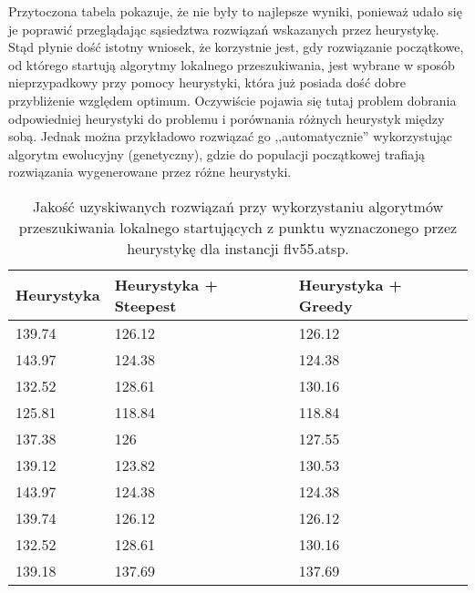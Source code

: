 Przytoczona tabela pokazuje, że nie były to najlepsze wyniki, ponieważ udało się je poprawić przeglądając sąsiedztwa rozwiązań wskazanych przez heurystykę. Stąd płynie dość istotny wniosek, że korzystnie jest, gdy rozwiązanie początkowe, od którego startują algorytmy lokalnego przeszukiwania, jest wybrane w sposób nieprzypadkowy przy pomocy heurystyki, która już posiada dość dobre przybliżenie względem optimum. Oczywiście pojawia się tutaj problem dobrania odpowiedniej heurystyki do problemu i porównania różnych heurystyk między sobą. Jednak można przykładowo rozwiązać go ,,automatycznie'' wykorzystując algorytm ewolucyjny (genetyczny), gdzie do populacji początkowej trafiają rozwiązania wygenerowane przez różne heurystyki.

\begin{table}[h!]
	\centering
       \begin{tabular}{|l|l|l|}
        \hline
		Heurystyka & Heurystyka + Steepest & Heurystyka + Greedy \\
		\hline
		139.74 & 126.12 & 126.12 \\
		143.97 & 124.38 & 124.38 \\
		132.52 & 128.61 & 130.16 \\
		125.81 & 118.84 & 118.84 \\
		137.38 & 126 & 127.55 \\
		139.12 & 123.82 & 130.53 \\
		143.97 & 124.38 & 124.38 \\
		139.74 & 126.12 & 126.12 \\
		132.52 & 128.61 & 130.16 \\
		139.18 & 137.69 & 137.69 \\
		\hline
		\end{tabular}
		\caption{Jakość uzyskiwanych rozwiązań przy wykorzystaniu algorytmów przeszukiwania lokalnego startujących z punktu wyznaczonego przez heurystykę dla instancji flv55.atsp.}
		\label{tab:heur_local}
\end{table}